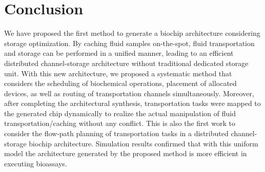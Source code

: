 \section{Conclusion}\label{sec:conclusion}
We have proposed the first method to generate a biochip architecture considering storage optimization. By caching fluid samples on-the-spot, fluid transportation and storage can be performed in a unified manner, leading to an efficient distributed channel-storage architecture without traditional dedicated storage unit. With this new architecture, we proposed a systematic method that considers the scheduling of biochemical operations, placement of allocated devices, as well as routing of transportation channels simultaneously. Moreover, after completing the architectural synthesis, transportation tasks were mapped to the generated chip dynamically to realize the actual manipulation of fluid transportation/caching without any conflict. This is also the first work to consider the flow-path planning of transportation tasks in a distributed channel-storage biochip architecture. Simulation results confirmed that with this uniform model the architecture generated by the proposed method is more efficient in executing bioassays.

